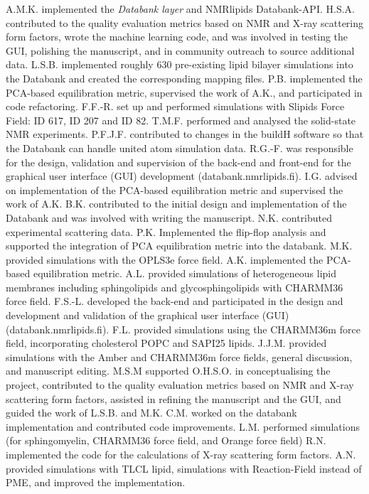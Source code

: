 \documentclass[fleqn,10pt]{wlscirep}
\begin{document}
A.M.K. implemented the {\it Databank layer} and NMRlipids Databank-API.
H.S.A. contributed to the quality evaluation metrics based on NMR and X-ray scattering form factors, wrote the machine learning code, and was involved in testing the GUI, polishing the manuscript, and in community outreach to source additional data.
L.S.B. implemented roughly 630 pre-existing lipid bilayer simulations into the Databank and created the corresponding mapping files.
P.B. implemented the PCA-based equilibration metric, supervised the work of A.K., and participated in code refactoring.
F.F.-R. set up and performed simulations with Slipids Force Field: ID 617, ID 207 and ID 82. 
T.M.F. performed and analysed the solid-state NMR experiments.
P.F.J.F. contributed to changes in the buildH software so that the Databank can handle united atom simulation data.
R.G.-F. was responsible for the design, validation and supervision of the back-end and front-end for the graphical user interface (GUI) development (databank.nmrlipids.fi).
I.G. advised on implementation of the PCA-based equilibration metric and supervised the work of A.K.
B.K. contributed to the initial design and implementation of the Databank and was involved with writing the manuscript.
N.K. contributed experimental scattering data. %
P.K. Implemented the flip-flop analysis and supported the integration of PCA equilibration metric into the databank.
M.K. provided simulations with the OPLS3e force field. 
A.K. implemented the PCA-based equilibration metric.
A.L. provided simulations of heterogeneous lipid membranes including sphingolipids and glycosphingolipids with CHARMM36 force field.
F.S.-L. developed the back-end and participated in the design and development and validation of the graphical user interface (GUI) (databank.nmrlipids.fi).
F.L. provided simulations using the CHARMM36m force field, incorporating cholesterol POPC and SAPI25 lipids.
J.J.M. provided simulations with the Amber and CHARMM36m force fields, general discussion, and manuscript editing.
M.S.M supported O.H.S.O. in conceptualising the project, contributed to the quality evaluation metrics based on NMR and X-ray scattering form factors, assisted in refining the manuscript and the GUI, and guided the work of L.S.B. and M.K.
C.M. worked on the databank implementation and contributed code improvements.
L.M. performed simulations (for sphingomyelin, CHARMM36 force field, and Orange force field)
R.N. implemented the code for the calculations of X-ray scattering form factors.
A.N. provided simulations with TLCL lipid, simulations with Reaction-Field instead of PME, and improved the implementation.
\end{document}
